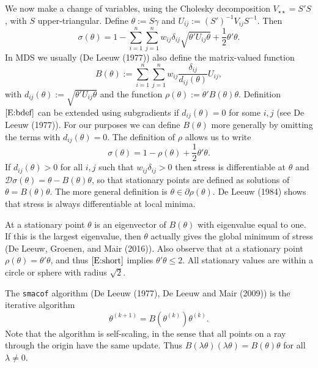 \documentclass[
  12pt,
]{article}
\begin{document}
We now make a change of variables, using the Cholesky decomposition \(V_{\star\star}=S'S\), with \(S\) upper-triangular. Define \(\theta:=S\gamma\) and \(U_{ij}:=(S')^{-1}V_{ij}S^{-1}\). Then
\begin{equation}
\sigma(\theta)=1-\sum_{i=1}^n\sum_{j=1}^nw_{ij}\delta_{ij}\sqrt{\theta'U_{ij}\theta}+\frac12\theta'\theta.\label{E:theta}
\end{equation}
In MDS we usually (De Leeuw (1977)) also define the matrix-valued function
\begin{equation}
B(\theta):=\sum_{i=1}^n\sum_{j=1}^nw_{ij}\frac{\delta_{ij}}{d_{ij}(\theta)}U_{ij},\label{E:bdef}
\end{equation}
with \(d_{ij}(\theta):=\sqrt{\theta'U_{ij}\theta}\) and the function \(\rho(\theta):=\theta'B(\theta)\theta\). Definition \(\eqref{E:bdef}\) can be extended using subgradients if \(d_{ij}(\theta)=0\) for some \(i,j\) (see De Leeuw (1977)). For our purposes we can define \(B(\theta)\) more generally by omitting the terms with
\(d_{ij}(\theta)=0\). The definition of \(\rho\) allows us to write
\begin{equation}
\sigma(\theta)=1-\rho(\theta)+\frac12\theta'\theta.\label{E:short}
\end{equation}
If \(d_{ij}(\theta)>0\) for all \(i,j\) such that \(w_{ij}\delta_{ij}>0\) then stress is differentiable at \(\theta\) and \(\mathcal{D}\sigma(\theta)=\theta-B(\theta)\theta\), so that stationary points are defined as solutions of \(\theta=B(\theta)\theta\). The more general definition
is \(\theta\in\partial\rho(\theta)\). De Leeuw (1984) shows that stress is always differentiable at local minima.

At a stationary point \(\theta\) is an eigenvector of \(B(\theta)\) with eigenvalue equal to one. If this is the largest eigenvalue, then \(\theta\) actually gives the global minimum of stress (De Leeuw, Groenen, and Mair (2016)). Also observe that at a stationary point
\(\rho(\theta)=\theta'\theta\), and thus \(\eqref{E:short}\) implies \(\theta'\theta\leq 2\). All stationary values are within a circle or sphere with radius
\(\sqrt{2}\).

The \texttt{smacof} algorithm (De Leeuw (1977), De Leeuw and Mair (2009)) is the iterative algorithm
\begin{equation}
\theta^{(k+1)}=B(\theta^{(k)})\theta^{(k)}.
\end{equation}
Note that the algorithm is self-scaling, in the sense that all points on a ray through the origin have the same update. Thus \(B(\lambda\theta)(\lambda\theta)= B(\theta)\theta\) for all \(\lambda\not= 0\).
\end{document}
